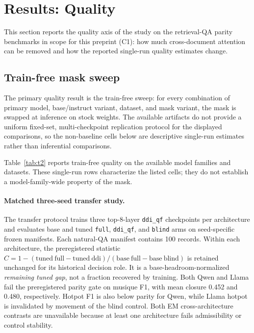 \section{Results: Quality}
\label{sec:results-quality}

This section reports the quality axis of the study on the retrieval-QA
parity benchmarks in scope for this preprint (C1): how much
cross-document attention can be removed and how the reported single-run
quality estimates change.

\subsection{Train-free mask sweep}
\label{sec:results-quality-sweep}

The primary quality result is the train-free sweep: for every combination
of primary model, base/instruct variant, dataset, and mask variant, the
mask is swapped at inference on stock weights. The available artifacts do
not provide a uniform fixed-set, multi-checkpoint replication protocol for
the displayed comparisons, so the non-baseline cells below are descriptive
single-run estimates rather than inferential comparisons.

Table~\ref{tab:t2} reports train-free quality on the available model
families and datasets. These single-run rows characterize the listed cells;
they do not establish a model-family-wide property of the mask.

\paragraph{Matched three-seed transfer study.}
The transfer protocol trains three top-8-layer \texttt{ddi\_qf} checkpoints
per architecture and evaluates base and tuned \texttt{full},
\texttt{ddi\_qf}, and \texttt{blind} arms on seed-specific frozen manifests.
Each natural-QA manifest contains 100 records. Within each architecture, the
preregistered statistic $C=1-(\mathrm{tuned\ full}-\mathrm{tuned\ ddi})/(\mathrm{base\ full}-\mathrm{base\ blind})$
is retained unchanged for its historical decision role. It is a base-headroom-normalized
\emph{remaining tuned gap}, not a fraction recovered by training. Both Qwen and Llama fail the
preregistered parity gate on musique F1, with mean closure 0.452 and 0.480,
respectively. Hotpot F1 is also below parity for Qwen, while Llama hotpot is
invalidated by movement of the blind control. Both EM cross-architecture
contrasts are unavailable because at least one architecture fails
admissibility or control stability.

